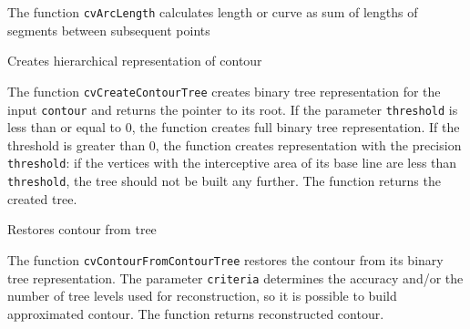 The function \texttt{cvArcLength} calculates length or curve as sum of lengths of segments between subsequent points

\label{CreateContourTree}

Creates hierarchical representation of contour


\begin{description}
\end{description}

The function \texttt{cvCreateContourTree} creates binary tree representation for the input \texttt{contour} and returns the pointer to its root. If the parameter \texttt{threshold} is less than or equal to 0, the function creates full binary tree representation. If the threshold is greater than 0, the function creates representation with the precision \texttt{threshold}: if the vertices with the interceptive area of its base line are less than \texttt{threshold}, the tree should not be built any further. The function returns the created tree.

\label{ContourFromContourTree}

Restores contour from tree


\begin{description}
\end{description}

The function \texttt{cvContourFromContourTree} restores the contour from its binary tree representation. The parameter \texttt{criteria} determines the accuracy and/or the number of tree levels used for reconstruction, so it is possible to build approximated contour. The function returns reconstructed contour.

